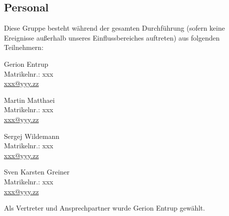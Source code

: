 \subsection{Personal}
\label{subsection:Pflichtenheft-Einfuehrung-Projektumfeld-Personal}

Diese Gruppe besteht während der gesamten Durchführung (sofern keine Ereignisse außerhalb unseres Einflussbereiches auftreten)  aus folgenden Teilnehmern:

\begin{multicols}{2}
    \parbox{\textwidth}{
        Gerion Entrup\\
        Matrikelnr.: xxx\\
        \href{mailto:xxx@yyy.zz}{xxx@yyy.zz}
    }

    \parbox{\textwidth}{
        Martin Matthaei\\
        Matrikelnr.: xxx\\
        \href{mailto:xxx@yyy.zz}{xxx@yyy.zz}
    }

    \parbox{\textwidth}{
        Sergej Wildemann\\
        Matrikelnr.: xxx\\
        \href{mailto:xxx@yyy.zz}{xxx@yyy.zz}
    }

    \parbox{\textwidth}{
        Sven Karsten Greiner\\
        Matrikelnr.: xxx\\
        \href{mailto:xxx@yyy.zz}{xxx@yyy.zz}
    }
\end{multicols}

Als Vertreter und Ansprechpartner wurde Gerion Entrup gewählt.

